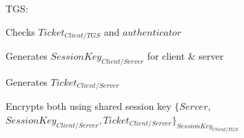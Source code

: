 \documentclass[a4paper]{article}
\begin{document}
\begin{multicols}{3}
    TGS:
    \begin{itemize*}
        \item Checks $Ticket_{Client/TGS}$ and $authenticator$
        \item Generates $SessionKey_{Client/Server}$ for client \& server
        \item Generates $Ticket_{Client/Server}$
        \item Encrypts both using shared session key $\{Server,$ $SessionKey_{Client/Server},Ticket_{Client/Server}\}_{SessionKey_{Client/TGS}}$
    \end{itemize*}

\end{multicols}
\end{document}
